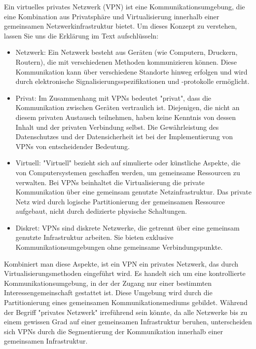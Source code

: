 Ein virtuelles privates Netzwerk (VPN) ist eine Kommunikationsumgebung, die eine Kombination aus Privatsphäre und Virtualisierung innerhalb einer gemeinsamen Netzwerkinfrastruktur bietet. Um dieses Konzept zu verstehen, lassen Sie uns die Erklärung im Text aufschlüsseln:

\begin{itemize}

\item Netzwerk: Ein Netzwerk besteht aus Geräten (wie Computern, Druckern, Routern), die mit verschiedenen Methoden kommunizieren können. Diese Kommunikation kann über verschiedene Standorte hinweg erfolgen und wird durch elektronische Signalisierungsspezifikationen und -protokolle ermöglicht.

\item Privat: Im Zusammenhang mit VPNs bedeutet "privat", dass die Kommunikation zwischen Geräten vertraulich ist. Diejenigen, die nicht an diesem privaten Austausch teilnehmen, haben keine Kenntnis von dessen Inhalt und der privaten Verbindung selbst. Die Gewährleistung des Datenschutzes und der Datensicherheit ist bei der Implementierung von VPNs von entscheidender Bedeutung.

\item Virtuell: "Virtuell" bezieht sich auf simulierte oder künstliche Aspekte, die von Computersystemen geschaffen werden, um gemeinsame Ressourcen zu verwalten. Bei VPNs beinhaltet die Virtualisierung die private Kommunikation über eine gemeinsam genutzte Netzinfrastruktur. Das private Netz wird durch logische Partitionierung der gemeinsamen Ressource aufgebaut, nicht durch dedizierte physische Schaltungen.

\item Diskret: VPNs sind diskrete Netzwerke, die getrennt über eine gemeinsam genutzte Infrastruktur arbeiten. Sie bieten exklusive Kommunikationsumgebungen ohne gemeinsame Verbindungspunkte.

\end{itemize}

Kombiniert man diese Aspekte, ist ein VPN ein privates Netzwerk, das durch Virtualisierungsmethoden eingeführt wird. Es handelt sich um eine kontrollierte Kommunikationsumgebung, in der der Zugang nur einer bestimmten Interessengemeinschaft gestattet ist. Diese Umgebung wird durch die Partitionierung eines gemeinsamen Kommunikationsmediums gebildet. Während der Begriff "privates Netzwerk" irreführend sein könnte, da alle Netzwerke bis zu einem gewissen Grad auf einer gemeinsamen Infrastruktur beruhen, unterscheiden sich VPNs durch die Segmentierung der Kommunikation innerhalb einer gemeinsamen Infrastruktur.

